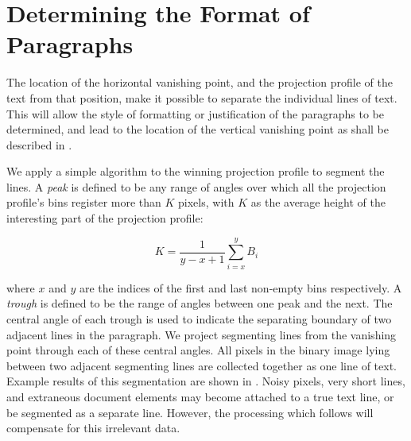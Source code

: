 

\section{Determining the Format  of Paragraphs} \label{sec-parags}

The location of the horizontal vanishing point, and the projection profile of
the text from that position, make it possible to separate the individual lines
of text.  This will allow the style of formatting or justification of the
paragraphs to be determined, and lead to the location of the vertical vanishing
point as shall be described in .

We apply a simple algorithm to the winning projection profile to segment the
lines.  A {\em peak} is defined to be any range of angles over which all the
projection profile's bins register more than $K$ pixels, with $K$ as the
average height of the interesting part of the projection profile:

\begin{equation}
K= \frac{1}{y-x+1} \sum_{i=x}^{y}B_i
\end{equation}

{\parindent 0mm
where $x$ and $y$ are the indices of the first and last non-empty bins respectively.
A {\em trough} is defined to be the range of angles between one peak and the next.  
The central angle of each trough is used to indicate the separating boundary of
two adjacent lines in the paragraph.  We project segmenting lines from the
vanishing point through each of these central angles.
All pixels in the binary image lying between two adjacent segmenting
lines are collected together as one line of text. Example results of this
segmentation are shown in .
Noisy pixels, very short lines, and extraneous document
elements may become attached to a true text line, or be segmented as a separate
line.  However, the processing which follows will compensate for this irrelevant
data. 
} 


